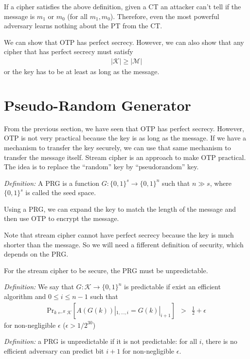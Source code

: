 \documentclass{article}
\begin{document}
If a cipher satisfies the above definition, given a CT an attacker can't tell
if the message is $m_1$ or $m_0$ (for all $m_1, m_0$). Therefore, even the most
powerful adversary learns nothing about the PT from the CT. 

We can show that OTP has perfect secrecy. However, we can also show that any 
cipher that has perfect secrecy must satisfy  
\begin{eqnarray}
|\mathcal{K}| \ge |\mathcal{M}|
\end{eqnarray}
or the key has to be at least as long as the message. 

\section{Pseudo-Random Generator}

From the previous section, we have seen that OTP has perfect secrecy. However,
OTP is not very practical because the key is as long as the message. If we have
a mechanism to transfer the key securely, we can use that same mechanism to 
transfer the message itself. Stream cipher is an approach to make OTP practical.
The idea is to replace the ``random'' key by ``pseudorandom'' key. 

\emph{Definition:} A PRG is a function $G: \lbrace 0,1 \rbrace^s \to \lbrace 0,
1 \rbrace^n$ such that $n \gg s$, where $\lbrace 0,1 \rbrace^s$ is called the 
seed space. 

Using a PRG, we can expand the key to match the length of the message and then
use OTP to encrypt the message. 

Note that stream cipher cannot have perfect secrecy because the key is much 
shorter than the message. So we will need a fifferent definition of security, 
which depends on the PRG.

For the stream cipher to be secure, the PRG must be unpredictable. 

\emph{Definition:} We say that $G: \mathcal{K} \to \lbrace 0, 1 \rbrace^n$ is 
predictable if exist an efficient algorithm and $0 \le i \le n-1$ such that
\begin{eqnarray}
\text{Pr}_{k \leftarrow^R \mathcal{K}} \left[ A(G(k))|_{1, \ldots, i} = G(k)|_{i+1}
 \right]  &>&\frac{1}{2} + \epsilon
\end{eqnarray}
for non-negligible $\epsilon$ ($\epsilon > 1 / 2^{30}$)

\emph{Definition:} a PRG is unpredictable if it is not predictable: for all $i$,
there is no efficient adversary can predict bit $i+1$ for non-negligible 
$\epsilon$. 
\end{document}
